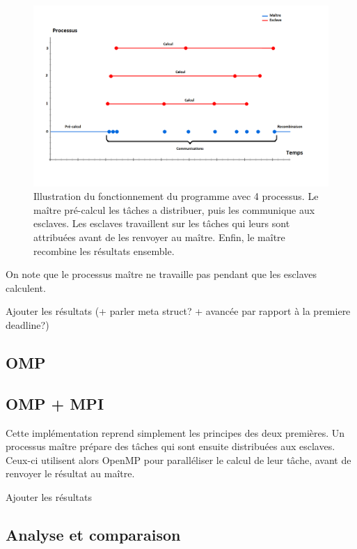 \documentclass[12pt]{article}
\begin{document}
    \begin{figure} \begin{center}
        \includegraphics[scale=0.33]{figures/time}
        \caption{\label{fig:time}Illustration du fonctionnement du programme
        avec 4 processus. Le maître pré-calcul les tâches a distribuer,
        puis les communique aux esclaves. Les esclaves travaillent sur les
        tâches qui leurs sont attribuées avant de les renvoyer au maître.
        Enfin, le maître recombine les résultats ensemble.}
    \end{center} \end{figure}
    On note que le processus maître ne travaille pas pendant que les esclaves
    calculent.\\
    \par {\color{red} Ajouter les résultats (+ parler meta struct?
    + avancée par rapport à la premiere deadline?)}
    \subsection{OMP}
    \subsection{OMP + MPI}
    Cette implémentation reprend simplement 
    les principes des deux premières. Un processus maître prépare des tâches
    qui sont ensuite distribuées aux esclaves. Ceux-ci utilisent alors OpenMP
    pour paralléliser le calcul de leur tâche, avant de renvoyer le résultat
    au maître.\\
    \par {\color{red} Ajouter les résultats}
    \subsection{Analyse et comparaison}
\end{document}
